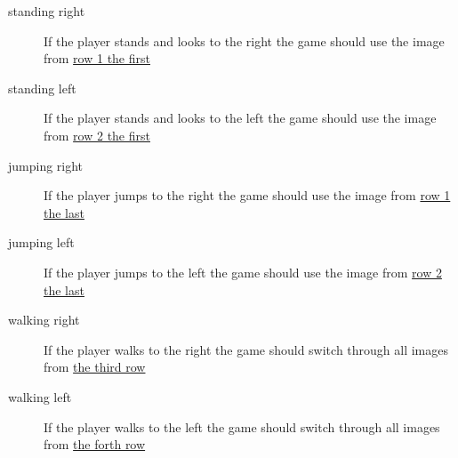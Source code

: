 \begin{description}
  \item[standing right] If the player stands and looks to the right the game should use the image from \ul{row 1 the first}
  \item[standing left] If the player stands and looks to the left the game should use the image from \ul{row 2 the first}
  \item[jumping right] If the player jumps to the right the game should use the image from \ul{row 1 the last}
  \item[jumping left] If the player jumps to the left the game should use the image from \ul{row 2 the last}
  \item[walking right] If the player walks to the right the game should switch through all images from \ul{the third row}
  \item[walking left] If the player walks to the left the game should switch through all images from \ul{the forth row}
\end{description}

\newpage
